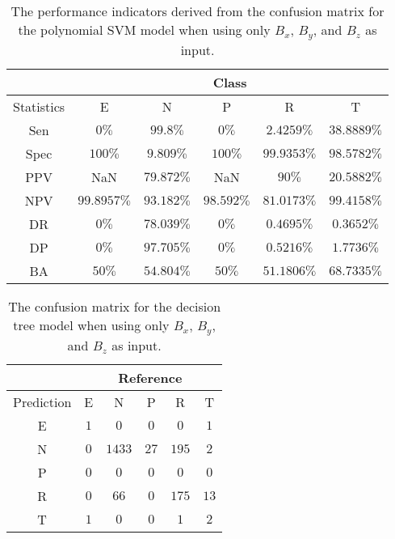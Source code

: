 \begin{table}[!ht]
	\centering
	\begin{tabular}{|c|c|c|c|c|c|}
		\hline
		 & \multicolumn{5}{c|}{Class} \\ \hline
		Statistics & E & N & P & R & T \\ \hline
		Sen & $0\%$ & $99.8\%$ & $0\%$ & $2.4259\%$ & $38.8889\%$ \\ \hline
		Spec & $100\%$ & $9.809\%$ & $100\%$ & $99.9353\%$ & $98.5782\%$ \\ \hline
		PPV & NaN & $79.872\%$ & NaN & $90\%$ & $20.5882\%$ \\ \hline
		NPV & $99.8957\%$ & $93.182\%$ & $98.592\%$ & $81.0173\%$ & $99.4158\%$ \\ \hline
		DR & $0\%$ & $78.039\%$ & $0\%$ & $0.4695\%$ & $0.3652\%$ \\ \hline
		DP & $0\%$ & $97.705\%$ & $0\%$ & $0.5216\%$ & $1.7736\%$ \\ \hline
		BA & $50\%$ & $54.804\%$ & $50\%$ & $51.1806\%$ & $68.7335\%$ \\ \hline
	\end{tabular}
	\caption{The performance indicators derived from the confusion matrix for the polynomial SVM model when using only $B_{x}$, $B_{y}$, and $B_{z}$ as input.}
	\label{tab:cs:reverse:coord:svmPoly}
\end{table}

\begin{table}[!ht]
	\centering
	\begin{tabular}{|c|c|c|c|c|c|}
		\hline
		 & \multicolumn{5}{|c|}{Reference} \\ \hline
		 Prediction & E & N & P & R & T \\ \hline
		 E & $1$ & $0$ & $0$ & $0$ & $1$ \\ \hline
		 N & $0$ & $1433$ & $27$ & $195$ & $2$ \\ \hline
		 P & $0$ & $0$ & $0$ & $0$ & $0$ \\ \hline
		 R & $0$ & $66$ & $0$ & $175$ & $13$ \\ \hline
		 T & $1$ & $0$ & $0$ & $1$ & $2$ \\ \hline
	\end{tabular}
	\caption{The confusion matrix for the decision tree model when using only $B_{x}$, $B_{y}$, and $B_{z}$ as input.}
	\label{tab:cm:coord:C5.0}
\end{table}

